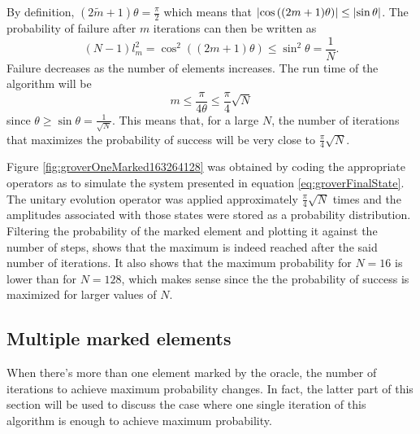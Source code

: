 \documentclass[../../dissertation.tex]{subfiles}
\begin{document}
By definition, $(2\widetilde{m}+1)\theta = \frac{\pi}{2}$ which means that
$\abs{\cos{((2m+1)}\theta)} \leq \abs{\sin{\theta}}$. The probability of
failure after $m$ iterations can then be written as
\begin{equation}
	(N-1)l_m^2 = \cos^2{((2m+1)\theta)} \leq \sin^2\theta = \frac{1}{N}.
\end{equation}
Failure decreases as the number of elements increases. The run time of the algorithm will be
\begin{equation}
	m \leq \frac{\pi}{4\theta} \leq \frac{\pi}{4}\sqrt{N}
\end{equation}
since $\theta \geq \sin\theta = \frac{1}{\sqrt{N}}$. This means that, for a
large $N$, the number of iterations that maximizes the probability of success
will be very close to $\frac{\pi}{4}\sqrt{N}$.\par 
Figure \ref{fig:groverOneMarked163264128} was obtained by coding the appropriate
operators as to simulate the system presented in equation
\eqref{eq:groverFinalState}. 
The unitary evolution operator was applied approximately
$\frac{\pi}{4}\sqrt{N}$ times and the amplitudes associated with those states
were stored as a probability distribution. Filtering the probability of the
marked element and plotting it against the number of steps, shows that the
maximum is indeed reached after the said number of iterations. It also shows
that the maximum probability for $N=16$ is lower than for $N=128$, which makes
sense since the the probability of success is maximized for larger values of
$N$.

\subsection{Multiple marked elements}
When there's more than one element marked by the oracle, the number of
iterations to achieve maximum probability changes. In fact, the latter part of
this section will be used to discuss the case where one single iteration of
this algorithm is enough to achieve maximum probability.\par 
\end{document}
